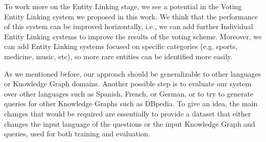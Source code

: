 To work more on the Entity Linking stage, we see a potential in the Voting Entity Linking system we 
proposed in this work. We think that the performance of this system can be improved horizontally, 
i.e., we can add further Individual Entity Linking systems to improve the results of the voting scheme. 
Moreover, we can add Entity Linking systems focused on specific categories (e.g. sports, medicine, 
music, etc), so more rare entities can be identified more easily.

As we mentioned before, our approach should be generalizable to other languages or Knowledge Graph 
domains. Another possible step is to evaluate our system over other languages such as Spanish, 
French, or German, or to try to generate \SPARQL{} queries for other Knowledge Graphs such as DBpedia. 
To give an idea, the main changes that would be required are essentially to provide a dataset that either 
changes the input language of the questions or the input Knowledge Graph and \SPARQL{} queries, used 
for both training and evaluation.
